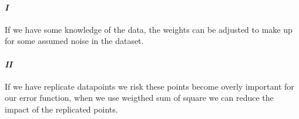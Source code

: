 \documentclass{article}
\begin{document}
\paragraph{\emph{I}}
If we have some knowledge of the data, the weights can be adjusted to make
up for some assumed noise in the dataset.

\paragraph{\emph{II}}
If we have replicate datapoints we risk
these points become overly important for our error function, when we use
weigthed sum of square we can reduce the impact of the replicated points.
\end{document}
